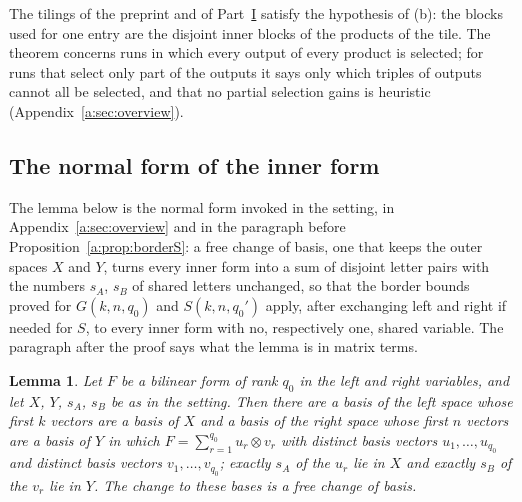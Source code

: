 \documentclass[11pt]{article}
\newtheorem{lemma}[theorem]{Lemma}
\theoremstyle{definition}
\theoremstyle{remark}
\begin{document}
The tilings of the preprint and of Part~\hyperref[m:partI]{I} satisfy the hypothesis of (b): the blocks used for one entry are the disjoint inner blocks of the products of the tile. The theorem concerns runs in which every output of every product is selected; for runs that select only part of the outputs it says only which triples of outputs cannot all be selected, and that no partial selection gains is heuristic (Appendix~\ref{a:sec:overview}).

\subsection{The normal form of the inner form}\label{a:sec:normal}

The lemma below is the normal form invoked in the setting, in Appendix~\ref{a:sec:overview} and in the paragraph before Proposition~\ref{a:prop:borderS}: a free change of basis, one that keeps the outer spaces $X$ and $Y$, turns every inner form into a sum of disjoint letter pairs with the numbers $s_A$, $s_B$ of shared letters unchanged, so that the border bounds proved for $G(k,n,q_0)$ and $S(k,n,q_0')$ apply, after exchanging left and right if needed for $S$, to every inner form with no, respectively one, shared variable. The paragraph after the proof says what the lemma is in matrix terms.

\begin{lemma}\label{a:lem:normal}
Let $F$ be a bilinear form of rank $q_0$ in the left and right variables, and let $X$, $Y$, $s_A$, $s_B$ be as in the setting. Then there are a basis of the left space whose first $k$ vectors are a basis of $X$ and a basis of the right space whose first $n$ vectors are a basis of $Y$ in which $F=\sum_{r=1}^{q_0}u_r\otimes v_r$ with distinct basis vectors $u_1,\dots,u_{q_0}$ and distinct basis vectors $v_1,\dots,v_{q_0}$; exactly $s_A$ of the $u_r$ lie in $X$ and exactly $s_B$ of the $v_r$ lie in $Y$. The change to these bases is a free change of basis.
\end{lemma}
\end{document}
